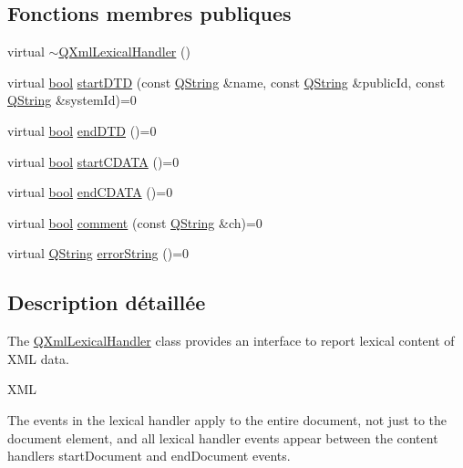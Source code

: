 \subsection*{Fonctions membres publiques}
\begin{DoxyCompactItemize}
\item 
virtual \hyperlink{class_q_xml_lexical_handler_a92a91bfe1e9666a6bc2f411ba6de86a7}{$\sim$\+Q\+Xml\+Lexical\+Handler} ()
\item 
virtual \hyperlink{qglobal_8h_a1062901a7428fdd9c7f180f5e01ea056}{bool} \hyperlink{class_q_xml_lexical_handler_a1bdcb91e384a32b218d04304e1116808}{start\+D\+T\+D} (const \hyperlink{class_q_string}{Q\+String} \&name, const \hyperlink{class_q_string}{Q\+String} \&public\+Id, const \hyperlink{class_q_string}{Q\+String} \&system\+Id)=0
\item 
virtual \hyperlink{qglobal_8h_a1062901a7428fdd9c7f180f5e01ea056}{bool} \hyperlink{class_q_xml_lexical_handler_a7f5188d7a0a54b6c276c5e7e2faa72bc}{end\+D\+T\+D} ()=0
\item 
virtual \hyperlink{qglobal_8h_a1062901a7428fdd9c7f180f5e01ea056}{bool} \hyperlink{class_q_xml_lexical_handler_a64c691b5eeae5af0230d5fad46be2df2}{start\+C\+D\+A\+T\+A} ()=0
\item 
virtual \hyperlink{qglobal_8h_a1062901a7428fdd9c7f180f5e01ea056}{bool} \hyperlink{class_q_xml_lexical_handler_af318cf25fa252c8bf7a4e8d2c4b26350}{end\+C\+D\+A\+T\+A} ()=0
\item 
virtual \hyperlink{qglobal_8h_a1062901a7428fdd9c7f180f5e01ea056}{bool} \hyperlink{class_q_xml_lexical_handler_ac71e12338ca541b374dbb88c96f15fa2}{comment} (const \hyperlink{class_q_string}{Q\+String} \&ch)=0
\item 
virtual \hyperlink{class_q_string}{Q\+String} \hyperlink{class_q_xml_lexical_handler_a2b1fdd6448b6a07b2af197fd3aca60d3}{error\+String} ()=0
\end{DoxyCompactItemize}


\subsection{Description détaillée}
The \hyperlink{class_q_xml_lexical_handler}{Q\+Xml\+Lexical\+Handler} class provides an interface to report lexical content of X\+M\+L data. 

X\+M\+L

The events in the lexical handler apply to the entire document, not just to the document element, and all lexical handler events appear between the content handler\textquotesingle{}s start\+Document and end\+Document events.


